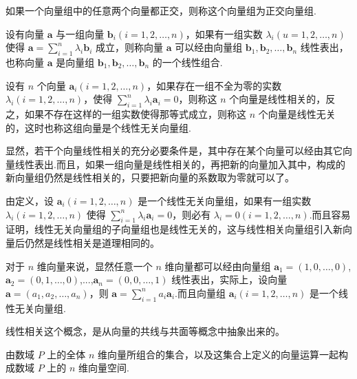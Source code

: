 \begin{definition}
  如果一个向量组中的任意两个向量都正交，则称这个向量组为正交向量组.
\end{definition}

\begin{definition}
  设有向量 $\bm{a}$ 与一组向量 $\bm{b}_i (i = 1, 2,
  \ldots, n)$，如果有一组实数 $\lambda_i (u = 1, 2, \ldots, n)$ 使得
  $\bm{a}= \sum_{i = 1}^n \lambda_i \bm{b}_i$
  成立，则称向量 $\bm{a}$ 可以经由向量组 $\bm{b}_1,
  \bm{b}_2, \ldots, \bm{b}_n$ 线性表出，也称向量
  $\bm{a}$ 是向量组 $\bm{b}_1, \bm{b}_2, \ldots,
  \bm{b}_n$ 的一个线性组合.
\end{definition}

\begin{definition}
  设有 $n$ 个向量 $\bm{a}_i (i = 1, 2, \ldots,
  n)$，如果存在一组不全为零的实数 $\lambda_i (i = 1, 2, \ldots,
  n)$，使得 $\sum_{i = 1}^n \lambda_i \bm{a}_i = 0$，则称这 $n$
  个向量是线性相关的，反之，如果不存在这样的一组实数使得那等式成立，则称这
  $n$
  个向量是线性无关的，这时也称这组向量是个线性无关向量组.
\end{definition}

显然，若干个向量线性相关的充分必要条件是，其中存在某个向量可以经由其它向量线性表出.而且，如果一组向量是线性相关的，再把新的向量加入其中，构成的新向量组仍然是线性相关的，只要把新向量的系数取为零就可以了。

由定义，设 $\bm{a}_i (i = 1, 2, \ldots, n)$
是一个线性无关向量组，如果有一组实数 $\lambda_i (i = 1, 2,
\ldots, n)$ 使得 $\sum_{i = 1}^n \lambda_i \bm{a}_i = 0$，则必有
$\lambda_i = 0 (i = 1, 2, \ldots,
n)$.而且容易证明，线性无关向量组的子向量组也是线性无关的，这与线性相关向量组引入新向量后仍然是线性相关是道理相同的。

\begin{example}
  对于 $n$ 维向量来说，显然任意一个 $n$
  维向量都可以经由向量组 $\bm{a}_1 = (1, 0, \ldots, 0)$,
  $\bm{a}_2 = (0, 1, \ldots, 0)$,...,$\bm{a}_n = (0, 0, \ldots,
  1)$ 线性表出，实际上，设向量 $\bm{a}= (a_1, a_2, \ldots,
  a_n)$，则 $\bm{a}= \sum_{i = 1}^n a_i
  \bm{a}_i$.而且向量组 $\bm{a}_i (i = 1, 2, \ldots, n)$
  是一个线性无关向量组.
\end{example}

线性相关这个概念，是从向量的共线与共面等概念中抽象出来的。

\begin{definition}
  由数域 $P$ 上的全体 $n$
  维向量所组合的集合，以及这集合上定义的向量运算一起构成数域
  $P$ 上的 $n$ 维向量空间.
\end{definition}

